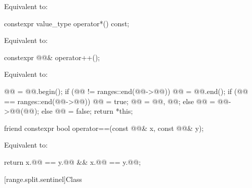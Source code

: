 \begin{itemdescr}
\pnum
\effects
Equivalent to: 
\end{itemdescr}

%
\begin{itemdecl}
constexpr value_type operator*() const;
\end{itemdecl}

\begin{itemdescr}
\pnum
\effects
Equivalent to: 
\end{itemdescr}

%
\begin{itemdecl}
constexpr @@& operator++();
\end{itemdecl}

\begin{itemdescr}
\pnum
\effects
Equivalent to:
\begin{codeblock}
@@ = @@.begin();
if (@@ != ranges::end(@@->@@)) {
  @@ = @@.end();
  if (@@ == ranges::end(@@->@@)) {
    @@ = true;
    @@ = {@@, @@};
  } else {
    @@ = @@->@@(@@);
  }
} else {
  @@ = false;
}
return *this;
\end{codeblock}
\end{itemdescr}

%
\begin{itemdecl}
friend constexpr bool operator==(const @@& x, const @@& y);
\end{itemdecl}

\begin{itemdescr}
\pnum
\effects
Equivalent to:
\begin{codeblock}
return x.@@ == y.@@ && x.@@ == y.@@;
\end{codeblock}
\end{itemdescr}

[range.split.sentinel]{Class }

